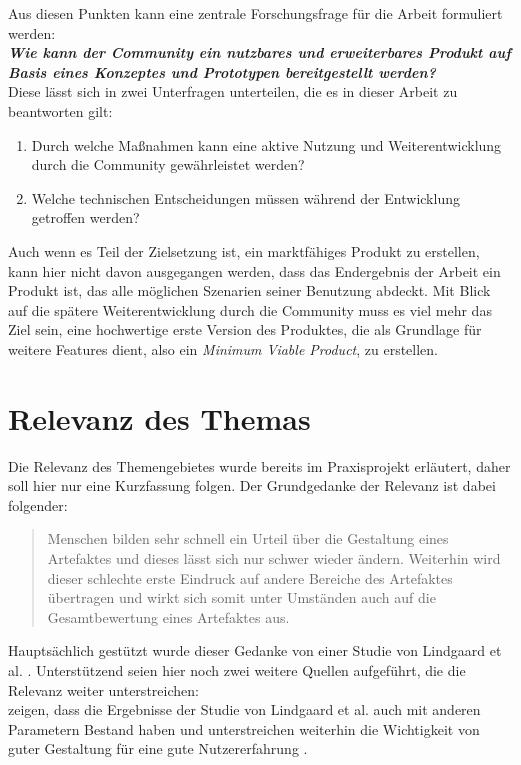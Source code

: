 
Aus diesen Punkten kann eine zentrale Forschungsfrage für die Arbeit formuliert werden:\\

\textit{\textbf{Wie kann der Community ein nutzbares und erweiterbares Produkt auf Basis eines Konzeptes und Prototypen bereitgestellt werden?}}\\

Diese lässt sich in zwei Unterfragen unterteilen, die es in dieser Arbeit zu beantworten gilt:
\begin{enumerate}
  \item Durch welche Maßnahmen kann eine aktive Nutzung und Weiterentwicklung durch die Community gewährleistet werden?
  \item Welche technischen Entscheidungen müssen während der Entwicklung getroffen werden?
\end{enumerate}

Auch wenn es Teil der Zielsetzung ist, ein marktfähiges Produkt zu erstellen, kann hier nicht davon ausgegangen werden, dass das Endergebnis der Arbeit ein Produkt ist, das alle möglichen Szenarien seiner Benutzung abdeckt. Mit Blick auf die spätere Weiterentwicklung durch die Community muss es viel mehr das Ziel sein, eine hochwertige erste Version des Produktes, die als Grundlage für weitere Features dient, also ein \textit{Minimum Viable Product}, zu erstellen.


\section{Relevanz des Themas}
\label{sec:relevance}
Die Relevanz des Themengebietes wurde bereits im Praxisprojekt erläutert, daher soll hier nur eine Kurzfassung folgen. Der Grundgedanke der Relevanz ist dabei folgender:

\begin{quote}
  Menschen bilden sehr schnell ein Urteil über die Gestaltung eines Artefaktes und dieses lässt sich nur schwer wieder ändern. Weiterhin wird dieser schlechte erste Eindruck auf andere Bereiche des Artefaktes übertragen und wirkt sich somit unter Umständen auch auf die Gesamtbewertung eines Artefaktes aus. \cite{PoplawskiPP}
\end{quote}

Hauptsächlich gestützt wurde dieser Gedanke von einer Studie von Lindgaard et al. \cite{lindgaard2006attention}. Unterstützend seien hier noch zwei weitere Quellen aufgeführt, die die Relevanz weiter unterstreichen:\\
\cite{tractinsky2006evaluating} zeigen, dass die Ergebnisse der Studie von Lindgaard et al. auch mit anderen Parametern Bestand haben und unterstreichen weiterhin die Wichtigkeit von guter Gestaltung für eine gute Nutzererfahrung \cite{tractinsky2000beautiful}.

